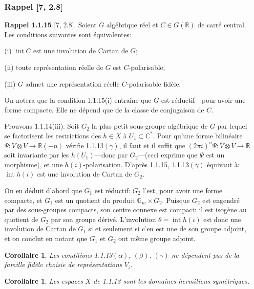 \documentclass[12pt,a4paper]{article}
\theoremstyle{plain}
\newtheorem{corollary}[theorem]{Corollaire}
\theoremstyle{definition}
\theoremstyle{remark}
\DeclareMathOperator{\Int}{int}
\newcommand{\RR}{\mathbb{R}}
\newcommand{\CC}{\mathbb{C}}
\newcommand{\Gm}{\mathbb{G}}
\begin{document}
\subsubsection{Rappel [7, 2.8]}

\textbf{Rappel 1.1.15} [7, 2.8]. Soient $G$ alg\'ebrique r\'eel et $C \in G(\RR)$ de carr\'e central. Les conditions suivantes sont \'equivalentes:

(i) $\Int C$ est une involution de Cartan de $G$;

(ii) toute repr\'esentation r\'eelle de $G$ est $C$-polarisable;

(iii) $G$ admet une repr\'esentation r\'eelle $C$-polarisable fid\`ele.

On notera que la condition 1.1.15(i) entra\^ine que $G$ est r\'eductif---pour avoir une forme compacte. Elle ne d\'epend que de la classe de conjugaison de $C$.

Prouvons 1.1.14(iii). Soit $G_2$ la plus petit sous-groupe alg\'ebrique de $G$ par lequel se factorisent les restrictions des $h \in X$ \`a $U_1 \subset \CC^*$. Pour qu'une forme bilin\'eaire $\Psi:V \otimes V \to \RR(-n)$ v\'erifie 1.1.13$(\gamma)$, il faut et il suffit que $(2\pi i)^n\Psi:V \otimes V \to \RR$ soit invariante par les $h(U_1)$---donc par $G_2$---(ceci exprime que $\Psi$ est un morphisme), et une $h(i)$-polarisation. D'apr\`es 1.1.15, 1.1.13$(\gamma)$ \'equivaut \`a: $\Int h(i)$ est une involution de Cartan de $G_2$.

On en d\'eduit d'abord que $G_1$ est r\'eductif: $G_2$ l'est, pour avoir une forme compacte, et $G_1$ est un quotient du produit $\Gm_m \times G_2$. Puisque $G_2$ est engendr\'e par des sous-groupes compacts, son centre connexe est compact: il est isog\`ene au quotient de $G_2$ par son groupe d\'eriv\'e. L'involution $\theta = \Int h(i)$ est donc une involution de Cartan de $G_1$ si et seulement si c'en est une de son groupe adjoint, et on conclut en notant que $G_1$ et $G_2$ ont m\^eme groupe adjoint.

\begin{corollary}
Les conditions 1.1.13$(\alpha)$, $(\beta)$, $(\gamma)$ ne d\'ependent pas de la famille fid\`ele choisie de repr\'esentations $V_i$.
\end{corollary}

\begin{corollary}
Les espaces $X$ de \textup{1.1.13} sont les domaines hermitiens sym\'etriques.
\end{corollary}
\end{document}
